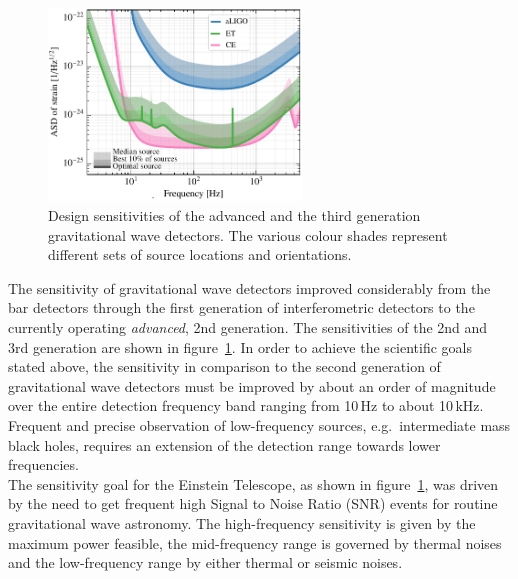 \begin{figure}
\vskip -0.4cm
	\centering
	\includegraphics[width=0.6\textwidth]{Intro/Intro_Figures/noises_percentiles-Voyager(1).pdf}
	\caption{Design sensitivities of the advanced and the third generation gravitational wave detectors. The various colour shades represent different sets of source locations and orientations.}
	\label{fig:GW_sens_evolution}
\end{figure}
The sensitivity of gravitational wave detectors improved considerably from 
the bar detectors through the first generation of interferometric detectors to the currently operating \textit{advanced}, 2nd generation. The sensitivities of the 2nd and 3rd generation are shown in figure~\ref{fig:GW_sens_evolution}. 
In order to achieve the scientific goals stated above, the sensitivity in comparison to the second generation of gravitational wave detectors must be improved by about an order of magnitude over the entire detection frequency band ranging from 10\,Hz to about 10\,kHz. Frequent and precise observation of low-frequency sources, e.g.\ intermediate mass black holes, requires an extension of the detection range towards lower frequencies. \\
The sensitivity goal for the Einstein Telescope, as shown in figure~\ref{fig:GW_sens_evolution}, was driven by the need to get frequent high Signal to Noise Ratio (SNR) events for routine gravitational wave astronomy. The high-frequency sensitivity is given by the maximum power feasible, the mid-frequency range is governed by thermal noises and the low-frequency range by either thermal or seismic noises.\\

